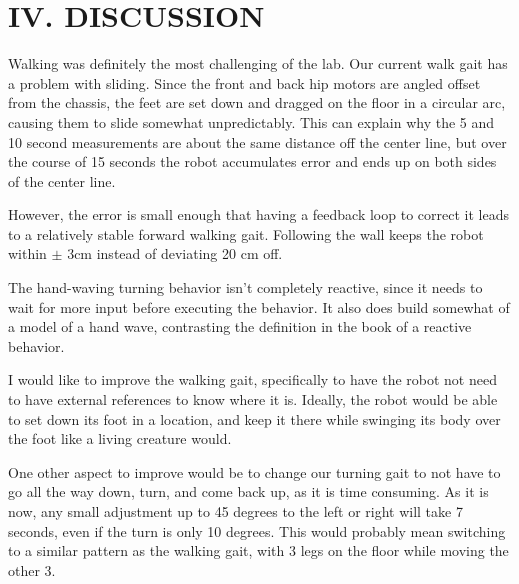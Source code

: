 \documentclass[11pt]{article}
\begin{document}
\section*{IV. DISCUSSION}

Walking was definitely the most challenging of the lab. Our current walk gait has a problem with sliding. Since the front and back hip motors are angled offset from the chassis, the feet are set down and dragged on the floor in a circular arc, causing them to slide somewhat unpredictably. This can explain why the 5 and 10 second measurements are about the same distance off the center line, but over the course of 15 seconds the robot accumulates error and ends up on both sides of the center line. 

However, the error is small enough that having a feedback loop to correct it leads to a relatively stable forward walking gait. Following the wall keeps the robot within $\pm$ 3cm instead of deviating 20 cm off.

The hand-waving turning behavior isn't completely reactive, since it needs to wait for more input before executing the behavior. It also does build somewhat of a model of a hand wave, contrasting the definition in the book of a reactive behavior.

I would like to improve the walking gait, specifically to have the robot not need to have external references to know where it is. Ideally, the robot would be able to set down its foot in a location, and keep it there while swinging its body over the foot like a living creature would.

One other aspect to improve would be to change our turning gait to not have to go all the way down, turn, and come back up, as it is time consuming. As it is now, any small adjustment up to 45 degrees to the left or right will take 7 seconds, even if the turn is only 10 degrees. This would probably mean switching to a similar pattern as the walking gait, with 3 legs on the floor while moving the other 3.

\end{document}
